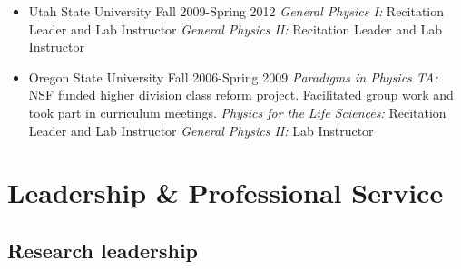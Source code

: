 \documentclass[11pt,letterpaper,sans,unicode]{moderncv}
\begin{document}
\begin{itemize}[leftmargin=8mm]
	\item Utah State University \hfill Fall 2009-Spring 2012
            	\newline \textit{General Physics I:} Recitation Leader and Lab Instructor
            	\newline \textit{General Physics II:} Recitation Leader and Lab Instructor
       	 \item Oregon State University  \hfill Fall 2006-Spring 2009
            	\newline \textit{Paradigms in Physics TA:} NSF funded higher division class reform project.
		\newline Facilitated group work and took part in curriculum meetings.
           	\newline \textit{Physics for the Life Sciences:} Recitation Leader and Lab Instructor
            	\newline \textit{General Physics II:} Lab Instructor
\end{itemize}

\section{Leadership \& Professional Service}

\subsection{Research leadership}

 \vspace{-0.1cm}

 \vspace{-0.1cm}

 \vspace{-0.1cm}
\end{document}
